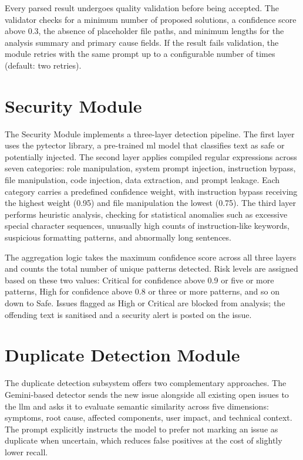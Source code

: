Every parsed result undergoes quality validation before being accepted. The validator checks for a minimum number of proposed solutions, a confidence score above 0.3, the absence of placeholder file paths, and minimum lengths for the analysis summary and primary cause fields. If the result fails validation, the module retries with the same prompt up to a configurable number of times (default: two retries).

\section{Security Module}

The Security Module implements a three-layer detection pipeline. The first layer uses the pytector library, a pre-trained \gls{ml} model that classifies text as safe or potentially injected. The second layer applies compiled regular expressions across seven categories: role manipulation, system prompt injection, instruction bypass, file manipulation, code injection, data extraction, and prompt leakage. Each category carries a predefined confidence weight, with instruction bypass receiving the highest weight (0.95) and file manipulation the lowest (0.75). The third layer performs heuristic analysis, checking for statistical anomalies such as excessive special character sequences, unusually high counts of instruction-like keywords, suspicious formatting patterns, and abnormally long sentences.

The aggregation logic takes the maximum confidence score across all three layers and counts the total number of unique patterns detected. Risk levels are assigned based on these two values: Critical for confidence above 0.9 or five or more patterns, High for confidence above 0.8 or three or more patterns, and so on down to Safe. Issues flagged as High or Critical are blocked from analysis; the offending text is sanitised and a security alert is posted on the issue.

\section{Duplicate Detection Module}

The duplicate detection subsystem offers two complementary approaches. The Gemini-based detector sends the new issue alongside all existing open issues to the \gls{llm} and asks it to evaluate semantic similarity across five dimensions: symptoms, root cause, affected components, user impact, and technical context. The prompt explicitly instructs the model to prefer not marking an issue as duplicate when uncertain, which reduces false positives at the cost of slightly lower recall.

